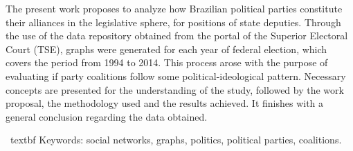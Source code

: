 The present work proposes to analyze how Brazilian political parties constitute their alliances in the legislative sphere, for positions of state deputies. Through the use of the data repository obtained from the portal of the Superior Electoral Court (TSE), graphs were generated for each year of federal election, which covers the period from 1994 to 2014. This process arose with the purpose of evaluating if party coalitions follow some political-ideological pattern. Necessary concepts are presented for the understanding of the study, followed by the work proposal, the methodology used and the results achieved. It finishes with a general conclusion regarding the data obtained.



\ textbf {Keywords:} social networks, graphs, politics, political parties, coalitions.
